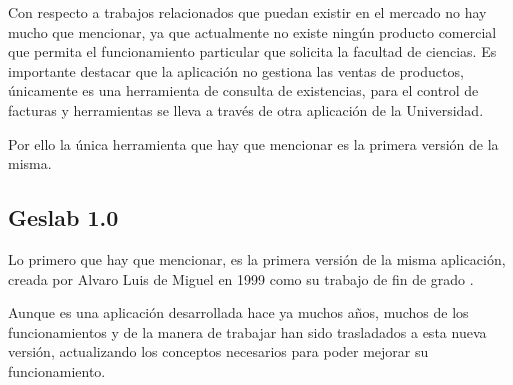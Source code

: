
Con respecto a trabajos relacionados que puedan existir en el mercado no hay mucho que mencionar, ya que actualmente no existe ningún producto comercial que permita el funcionamiento particular que solicita la facultad de ciencias. Es importante destacar que la aplicación no gestiona las ventas de productos, únicamente es una herramienta de consulta de existencias, para el control de facturas y herramientas se lleva a través de otra aplicación de la Universidad.

Por ello la única herramienta que hay que mencionar es la primera versión de la misma.

\subsection{Geslab 1.0}
Lo primero que hay que mencionar, es la primera versión de la misma aplicación, creada por Alvaro Luis de Miguel en 1999 como su trabajo de fin de grado \cite{GeslabV1}. 

Aunque es una aplicación desarrollada hace ya muchos años, muchos de los funcionamientos y de la manera de trabajar han sido trasladados a esta nueva versión, actualizando los conceptos necesarios para poder mejorar su funcionamiento.

